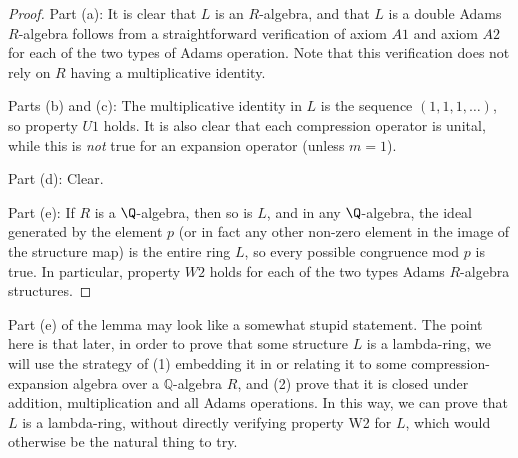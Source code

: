 \begin{proof}
Part (a): It is clear that $L$ is an $R$-algebra, and that $L$ is a double Adams $R$-algebra follows from a straightforward verification of axiom $A1$ and axiom $A2$ for each of the two types of Adams operation. Note that this verification does not rely on $R$ having a multiplicative identity. 

Parts (b) and (c): The multiplicative identity in $L$ is the sequence $(1, 1, 1, \ldots)$, so property $U1$ holds. It is also clear that each compression operator is unital, while this is \emph{not} true for an expansion operator (unless $m = 1$).

Part (d): Clear.

Part (e): If $R$ is a $\Q$-algebra, then so is $L$, and in any $\Q$-algebra, the ideal generated by the element $p$ (or in fact any other non-zero element in the image of the structure map) is the entire ring $L$, so every possible congruence mod $p$ is true. In particular, property $W2$ holds for each of the two types Adams $R$-algebra structures.

\end{proof}

\begin{remark}
Part (e) of the lemma may look like a somewhat stupid statement. The point here is that later, in order to prove that some structure $L$ is a lambda-ring, we will use the strategy of (1) embedding it in or relating it to some compression-expansion algebra over a $\mathbb{Q}$-algebra $R$, and (2) prove that it is closed under addition, multiplication and all Adams operations. In this way, we can prove that $L$ is a lambda-ring, without directly verifying property W2 for $L$, which would otherwise be the natural thing to try.
\end{remark}

